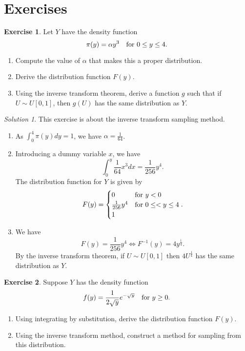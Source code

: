 \documentclass[
]{book}
\providecommand{\tightlist}{%
  \setlength{\itemsep}{0pt}\setlength{\parskip}{0pt}}
\theoremstyle{definition}
\theoremstyle{definition}
\theoremstyle{definition}
\newtheorem{exercise}{Exercise}[chapter]
\theoremstyle{definition}
\theoremstyle{remark}
\newtheorem*{solution}{Solution}
\begin{document}
\hypertarget{exercises-2}{%
\section{Exercises}\label{exercises-2}}

\begin{exercise}

Let \(Y\) have the density function
\[
\pi(y) = \alpha y^3 \quad \hbox{for } 0 \leq y \leq 4.
\]

\begin{enumerate}
\def\labelenumi{\arabic{enumi}.}
\tightlist
\item
  Compute the value of \(\alpha\) that makes this a proper distribution.
\item
  Derive the distribution function \(F(y)\).
\item
  Using the inverse transform theorem, derive a function \(g\) such that if \(U \sim U[0, 1]\), then \(g(U)\) has the same distribution as \(Y\).
\end{enumerate}

\end{exercise}

\begin{solution}

This exercise is about the inverse transform sampling method.

\begin{enumerate}
\def\labelenumi{\arabic{enumi}.}
\tightlist
\item
  As \(\int_0^4 \pi(y) dy = 1\), we have \(\alpha = \frac{1}{64}\).
\item
  Introducing a dummy variable \(x\), we have
  \[
  \int_0^y \frac{1}{64}x^3dx = \frac{1}{256}y^4.
  \]
  The distribution function for \(Y\) is given by
  \[
  F(y) = \begin{cases}
  0 & \hbox{for } y < 0\\
  \frac{1}{256}y^4 & \hbox{for } 0 \leq < y \leq 4 \\
  1 
  \end{cases}.
  \]
\item
  We have
  \[
  F(y) = \frac{1}{256}y^4 \iff F^{-1}(y) = 4y^{\frac{1}{4}}. 
  \]
  By the inverse transform theorem, if \(U \sim U[0, 1]\) then \(4U^{\frac{1}{4}}\) has the same distribution as \(Y\).
\end{enumerate}

\end{solution}

\begin{exercise}

Suppose \(Y\) has the density function
\[
f(y) = \frac{1}{2\sqrt{y}}e^{-\sqrt{y}} \quad \hbox{for } y \geq 0.
\]

\begin{enumerate}
\def\labelenumi{\arabic{enumi}.}
\tightlist
\item
  Using integrating by substitution, derive the distribution function \(F(y)\).
\item
  Using the inverse transform method, construct a method for sampling from this distribution.
\end{enumerate}

\end{exercise}
\end{document}
